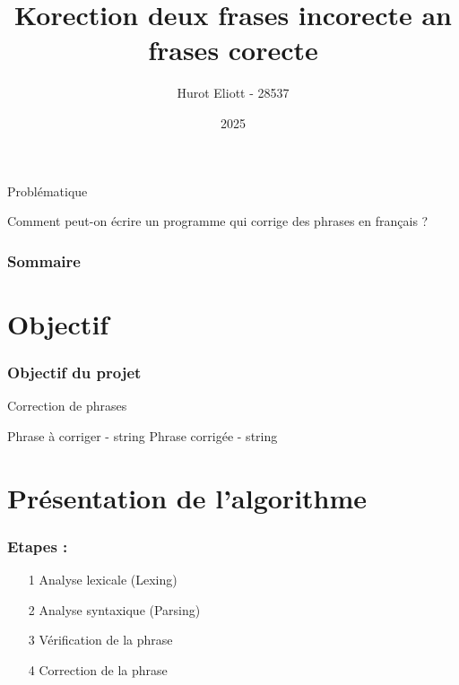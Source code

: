 \documentclass{beamer}
\title{Korection deux frases incorecte an frases corecte}
\author{Hurot Eliott - 28537}
\date{2025}
\begin{document}

\frame{\titlepage}

\begin{frame}{Problématique}
   \begin{center}
      \huge{Comment peut-on écrire un programme qui corrige des phrases en français ?}
   \end{center}
\end{frame}

\begin{frame}
   \frametitle{Sommaire}
   \tableofcontents
\end{frame}

\section{Objectif}
\begin{frame}
   \frametitle{Objectif du projet}
   \begin{algorithm}[H]
      \caption{Correction de phrases}
      \begin{algorithmic}
         \Require Phrase à corriger - string
         \Ensure Phrase corrigée - string
      \end{algorithmic}
   \end{algorithm}
\end{frame}

\section{Présentation de l'algorithme}
\begin{frame}
   \frametitle{Etapes :}
   \begin{enumerate}
      \item[\Large{1}] \Large{Analyse lexicale (Lexing)}
      \item[2] \Large{Analyse syntaxique (Parsing)}
      \item[3] \Large{Vérification de la phrase}
      \item[4] \Large{Correction de la phrase}
   \end{enumerate}
\end{frame}
\end{document}
